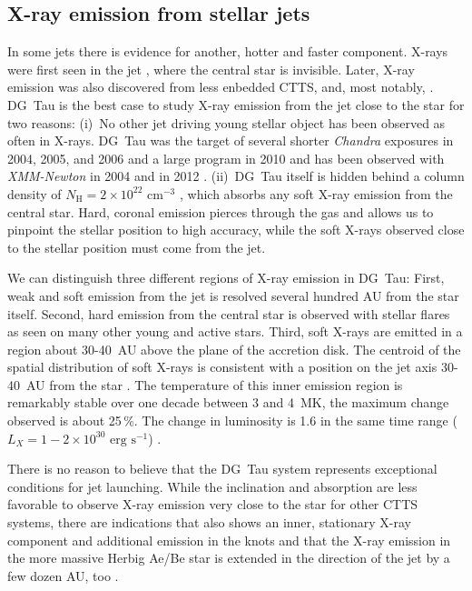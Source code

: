 \subsection{X-ray emission from stellar jets}
\label{sect:introxray}
In some jets there is evidence for another, hotter and faster component. X-rays were first seen in the jet  \citep{2001Natur.413..708P,2012A&A...542A.123S}, where the central star is invisible. Later, X-ray emission was also discovered from less enbedded CTTS,  \citep{2014ApJ...788..101S} and, most notably, . DG~Tau is the best case to study X-ray emission from the jet close to the star for two reasons: (i)~No other jet driving young stellar object has been observed as often in X-rays. DG~Tau was the target of several shorter \emph{Chandra} exposures in 2004, 2005, and 2006 and a large program in 2010 \citep{2005ApJ...626L..53G,2008A&A...478..797G,2011ASPC..448..617G} and has been observed with \emph{XMM-Newton} in 2004 \citep{2007A&A...468..353G} and in 2012 \citep{SchneiderDGTauXray}. (ii)~DG~Tau itself is hidden behind a column density of $N_{\textrm{H}}=2\times10^{22}\textrm{ cm}^{-3}$ \citep{2008A&A...478..797G}, which absorbs any soft X-ray emission from the central star. Hard, coronal emission pierces through the gas and allows us to pinpoint the stellar position to high accuracy, while the soft X-rays observed close to the stellar position must come from the jet.

We can distinguish three different regions of X-ray emission in DG~Tau: First, weak and soft emission from the jet is resolved several hundred AU from the star itself. Second, hard emission from the central star is observed with stellar flares as seen on many other young and active stars. Third, soft X-rays are emitted in a region about 30-40~AU above the plane of the accretion disk. The centroid of the spatial distribution of soft X-rays is consistent with a position on the jet axis 30-40~AU from the star \citep{2008A&A...488L..13S,2011ASPC..448..617G}. The temperature of this inner emission region is remarkably stable over one decade between 3 and 4~MK, the maximum change observed is about 25\,\%. The change in luminosity is 1.6 in the same time range ($L_X=1-2\times10^{30}\textrm{ erg s}^{-1}$) \citep{SchneiderDGTauXray}.

There is no reason to believe that the DG~Tau system represents exceptional conditions for jet launching. While the inclination and absorption are less favorable to observe X-ray emission very close to the star for other CTTS systems, there are indications that  also shows an inner, stationary X-ray component and additional emission in the knots \citep{2010A&A...511A..42B,2011A&A...530A.123S} and that the X-ray emission in the more massive Herbig Ae/Be star  is extended in the direction of the jet by a few dozen AU, too \citep{2005ApJ...628..811S,2009A&A...494.1041G,2013A&A...552A.142G}.


